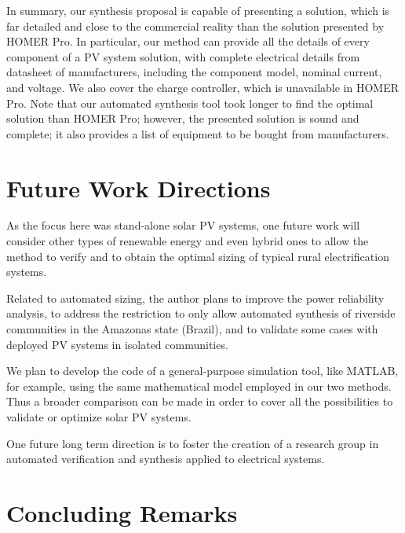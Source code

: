 In summary, our synthesis proposal is capable of presenting a solution, which is far detailed and close to the commercial reality than the solution presented by HOMER Pro. In particular, our method can provide all the details of every component of a PV system solution, with complete electrical details from datasheet of manufacturers, including the component model, nominal current, and voltage. We also cover the charge controller, which is unavailable in HOMER Pro. Note that our automated synthesis tool took longer to find the optimal solution than HOMER Pro; however, the presented solution is sound and complete; it also provides a list of equipment to be bought from manufacturers. %


\section{Future Work Directions}

As the focus here was stand-alone solar PV systems, one future work will consider other types of renewable energy and even hybrid ones to allow the method to verify and to obtain the optimal sizing of typical rural electrification systems.

Related to automated sizing, the author plans to improve the power reliability analysis, to address the restriction to only allow automated synthesis of riverside communities in the Amazonas state (Brazil), and to validate some cases with deployed PV systems in isolated communities.

We plan to develop the code of a general-purpose simulation tool, like MATLAB, for example, using the same mathematical model employed in our two methods. Thus a broader comparison can be made in order to cover all the possibilities to validate or optimize solar PV systems.

One future long term direction is to foster the creation of a research group in automated verification and synthesis applied to electrical systems.

\section{Concluding Remarks}

